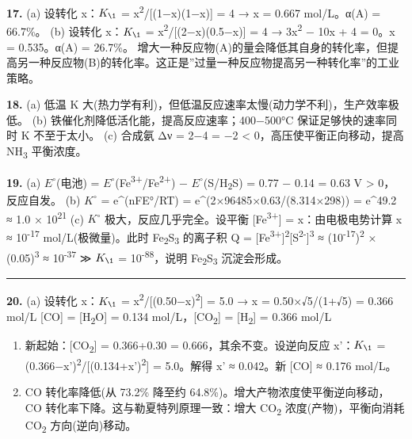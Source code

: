 \documentclass[a4paper,11pt]{ctexart}
\begin{document}
\textbf{17.}
(a) 设转化 x：\(K_{\1}\) = x\textsuperscript{2}/{[}(1−x)(1−x){]} = 4 → x = 0.667 mol/L。α(A) = 66.7\%。
(b) 设转化 x：\(K_{\1}\) = x\textsuperscript{2}/{[}(2−x)(0.5−x){]} = 4 → 3x\textsuperscript{2} − 10x + 4 = 0。x = 0.535。α(A) = 26.7\%。
增大一种反应物(A)的量会降低其自身的转化率，但提高另一种反应物(B)的转化率。这正是''过量一种反应物提高另一种转化率''的工业策略。

\textbf{18.}
(a) 低温 K 大(热力学有利)，但低温反应速率太慢(动力学不利)，生产效率极低。
(b) 铁催化剂降低活化能，提高反应速率；400−500°C 保证足够快的速率同时 K 不至于太小。
(c) 合成氨 Δν = 2−4 = −2 \textless{} 0，高压使平衡正向移动，提高 NH\textsubscript{3} 平衡浓度。

\textbf{19.}
(a) \(E^{\circ}\)(电池) = \(E^{\circ}\)(Fe\textsuperscript{3+}/Fe\textsuperscript{2+}) − \(E^{\circ}\)(S/H\textsubscript{2}S) = 0.77 − 0.14 = 0.63 V \textgreater{} 0，反应自发。
(b) \(K^{\circ}\) = e\^{}(nFE°/RT) = e\^{}(2×96485×0.63/(8.314×298)) = e\^{}49.2 ≈ 1.0 × 10\textsuperscript{21}
(c) \(K^{\circ}\) 极大，反应几乎完全。设平衡 {[}Fe\textsuperscript{3+}{]} = x：由电极电势计算 x ≈ 10\textsuperscript{-17} mol/L(极微量)。此时 Fe\textsubscript{2}S\textsubscript{3} 的离子积 Q = {[}Fe\textsuperscript{3+}{]}\textsuperscript{2}{[}S\textsuperscript{2-}{]}\textsuperscript{3} ≈ (10\textsuperscript{-17})\textsuperscript{2} × (0.05)\textsuperscript{3} ≈ 10\textsuperscript{-37} ≫ \(K_{\1}\) = 10\textsuperscript{-88}，说明 Fe\textsubscript{2}S\textsubscript{3} 沉淀会形成。

\begin{center}\rule{0.5\linewidth}{0.5pt}\end{center}

\textbf{20.}
(a) 设转化 x：\(K_{\1}\) = x\textsuperscript{2}/{[}(0.50−x)\textsuperscript{2}{]} = 5.0 → x = 0.50×√5/(1+√5) = 0.366 mol/L
{[}CO{]} = {[}H\textsubscript{2}O{]} = 0.134 mol/L，{[}CO\textsubscript{2}{]} = {[}H\textsubscript{2}{]} = 0.366 mol/L

\begin{enumerate}
\def\labelenumi{(\alph{enumi})}
\setcounter{enumi}{1}
\item
  新起始：{[}CO\textsubscript{2}{]} = 0.366+0.30 = 0.666，其余不变。设逆向反应 x'：\(K_{\1}\) = (0.366−x')\textsuperscript{2}/{[}(0.134+x')\textsuperscript{2}{]} = 5.0。解得 x' ≈ 0.042。新 {[}CO{]} ≈ 0.176 mol/L。
\item
  CO 转化率降低(从 73.2\% 降至约 64.8\%)。增大产物浓度使平衡逆向移动，CO 转化率下降。这与勒夏特列原理一致：增大 CO\textsubscript{2} 浓度(产物)，平衡向消耗 CO\textsubscript{2} 方向(逆向)移动。
\end{enumerate}
\end{document}
